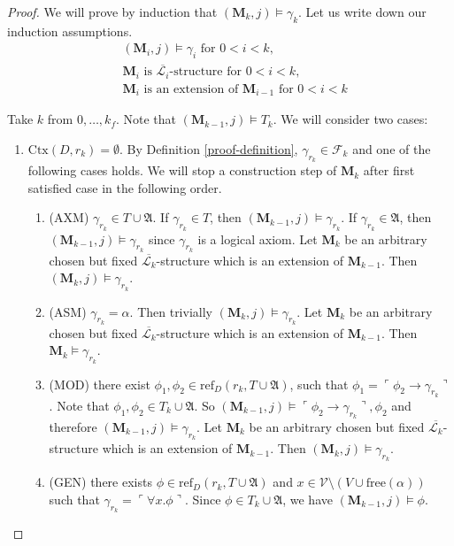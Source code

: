 \documentclass[10pt]{article}
\theoremstyle{plain}
\newcommand{\free}{\text{free}}
\newcommand{\F}{\mathcal{F}}
\newcommand{\context}{\text{Ctx}}
\renewcommand{\L}{\mathscr{L}}
\newcommand{\V}{\mathscr{V}}
\newcommand{\M}{\mathbf{M}}
\newcommand{\refset}{\text{ref}}
\begin{document}
\begin{proof}
We will prove by induction that $(\M_k,j)\models \gamma_{k}$.  
Let us write down our induction assumptions.
\begin{align}
\label{induction-a-1}
&(\M_i,j)\models \gamma_{i} \text{ for } 0 < i < k, \\
\label{induction-a-2}
&\M_i \text{ is } \overline{\L_i}\text{-structure} \text{ for } 0 < i < k, \\
\label{induction-a-3}
&\M_i \text{ is an extension of } \M_{i-1} \text{ for } 0 < i < k
\end{align}

Take $k$ from $0, \dots, k_f$. Note that $(\M_{k-1}, j)\models T_k$. We will consider two cases:
\begin{enumerate}
\item $\context(D, r_k) = \emptyset$. By Definition \ref{proof-definition}, $\gamma_{r_k}\in \F_k$ and one of the following cases holds. We will stop a construction step of $\M_k$ after first satisfied case in the following order.

\begin{enumerate}
\item (AXM) $\gamma_{r_k}\in T \cup \mathfrak{A}$. If $\gamma_{r_k}\in T$, then $(\M_{k-1}, j)\models\gamma_{r_k}$. If $\gamma_{r_k}\in \mathfrak{A}$, then $(\M_{k-1}, j)\models\gamma_{r_k}$ since $\gamma_{r_k}$ is a logical axiom. Let $\M_k$ be an arbitrary chosen but fixed $\overline{\L_k}$-structure which is an extension of $\M_{k-1}$. Then $(\M_k, j)\models\gamma_{r_k}$.

\item (ASM) $\gamma_{r_k} = \alpha$. Then trivially $(\M_k,j)\models \gamma_{r_k}$. Let $\M_k$ be an arbitrary chosen but fixed $\overline{\L_k}$-structure which is an extension of $\M_{k-1}$. Then
$\M_k\models \gamma_{r_k}$.


\item (MOD) there exist $\phi_1, \phi_2 \in \refset_D({r_k}, T\cup \mathfrak{A})$, such that
$\phi_1 = \ulcorner \phi_2 \to \gamma_{r_k} \urcorner$.
Note that $\phi_1, \phi_2\in T_k \cup \mathfrak{A}$.
So $(\M_{k-1}, j)\models \ulcorner \phi_2 \to \gamma_{r_k} \urcorner, \phi_2$ and therefore $(\M_{k-1},j)\models \gamma_{r_k}$. Let $\M_k$ be an arbitrary chosen but fixed $\overline{\L_k}$-structure which is an extension of $\M_{k-1}$. Then $(\M_k,j)\models \gamma_{r_k}$. 
\item \label{gen} (GEN) there exists $\phi\in\refset_D({r_k}, T\cup \mathfrak{A})$ and $x\in \V\setminus (V\cup \free(\alpha))$ such that
$\gamma_{r_k} = \ulcorner \forall x. \phi \urcorner$. Since $\phi\in T_k\cup\mathfrak{A}$, 
we have $(\M_{k-1}, j)\models \phi$.


\end{enumerate}
\end{enumerate}
\end{proof}
\end{document}
